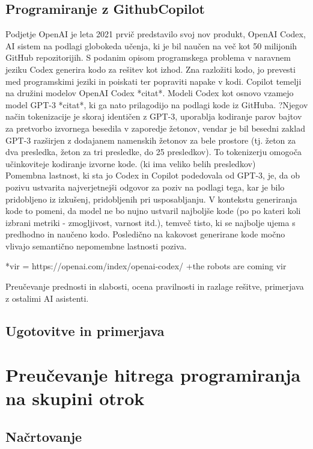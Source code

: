\documentclass[12pt,a4paper]{book}
\begin{document}
\section{Programiranje z GithubCopilot}
Podjetje OpenAI je leta 2021 prvič predstavilo svoj nov produkt, OpenAI Codex, AI sistem na podlagi globokeda učenja, ki je bil naučen na več kot 50 milijonih GitHub repozitorijih. S podanim opisom programskega problema v naravnem jeziku Codex generira kodo za rešitev kot izhod. Zna razložiti kodo, jo prevesti med programskimi jeziki in poiskati ter popraviti napake v kodi.
Copilot temelji na družini modelov OpenAI Codex *citat*. Modeli Codex kot osnovo vzamejo model GPT-3 *citat*, ki ga nato prilagodijo na podlagi kode iz GitHuba. ?Njegov način tokenizacije je skoraj identičen z GPT-3, uporablja kodiranje parov bajtov za pretvorbo izvornega besedila v zaporedje žetonov, vendar je bil besedni zaklad GPT-3 razširjen z dodajanem namenskih žetonov za bele prostore (tj. žeton za dva presledka, žeton za
tri presledke, do 25 presledkov). To tokenizerju omogoča učinkoviteje
kodiranje izvorne kode. (ki ima veliko belih presledkov) \\
Pomembna lastnost, ki sta jo Codex in Copilot podedovala od
GPT-3, je, da ob pozivu ustvarita najverjetnejši odgovor
za poziv na podlagi tega, kar je bilo pridobljeno
iz izkušenj, pridobljenih pri usposabljanju. V kontekstu generiranja kode to pomeni,
da model ne bo nujno ustvaril najboljše kode (po
po kateri koli izbrani metriki - zmogljivost, varnost itd.),
temveč tisto, ki se najbolje ujema s predhodno in naučeno kodo.
Posledično na kakovost generirane kode močno vlivajo semantično nepomembne lastnosti poziva. \cite{9833571}

*vir = https://openai.com/index/openai-codex/
+the robots are coming vir


Preučevanje prednosti in slabosti, ocena pravilnosti in razlage rešitve, primerjava z ostalimi  AI asistenti.

\section{Ugotovitve in primerjava}

\chapter{Preučevanje hitrega programiranja na skupini otrok}
\section{Načrtovanje}
\end{document}
